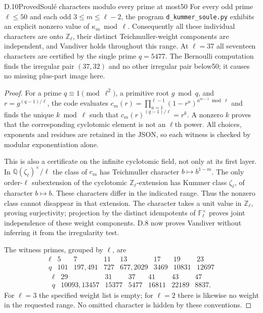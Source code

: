 \begin{statement}{D.10}{Proved}{Soulé characters modulo every prime at most50}
For every odd prime $\ell\leq50$ and each odd $3\leq m\leq\ell-2$, the program \texttt{d\_kummer\_soule.py} exhibits an explicit nonzero value of $\kappa_m\bmod\ell$. Consequently all these individual characters are onto $\mathbb Z_\ell$, their distinct Teichmuller-weight components are independent, and Vandiver holds throughout this range. At $\ell=37$ all seventeen characters are certified by the single prime $q=5477$. The Bernoulli computation finds the irregular pair $(37,32)$ and no other irregular pair below50; it causes no missing plus-part image here.
\end{statement}
\begin{proof}
For a prime $q\equiv1\pmod{\ell^2}$, a primitive root $g\bmod q$, and $r=g^{(q-1)/\ell}$, the code evaluates
$c_m(r)=\prod_{a=1}^{\ell-1}(1-r^a)^{a^{m-1}\bmod\ell}$ and finds the unique $k\bmod\ell$ such that
$c_m(r)^{(q-1)/\ell}=r^k$. A nonzero $k$ proves that the corresponding cyclotomic element is not an $\ell$th power. All choices, exponents and residues are retained in the JSON, so each witness is checked by modular exponentiation alone.

This is also a certificate on the infinite cyclotomic field, not only at its first layer. In $\mathbb Q(\zeta_\ell)^\times/\ell$ the class of $c_m$ has Teichmuller character $b\mapsto b^{1-m}$. The only order-$\ell$ subextension of the cyclotomic $\mathbb Z_\ell$-extension has Kummer class $\zeta_\ell$, of character $b\mapsto b$. These characters differ in the indicated range. Thus the nonzero class cannot disappear in that extension. The character takes a unit value in $\mathbb Z_\ell$, proving surjectivity; projection by the distinct idempotents of $\mathbb F_\ell^\times$ proves joint independence of these weight components. D.8 now proves Vandiver without inferring it from the irregularity test.

The witness primes, grouped by $\ell$, are
\[
\begin{array}{c|rrrrrrr}
\ell&5&7&11&13&17&19&23\\\hline
q&101&197,491&727&677,2029&3469&10831&12697
\end{array}
\]
\[
\begin{array}{c|rrrrrr}
\ell&29&31&37&41&43&47\\\hline
q&10093,13457&15377&5477&16811&22189&8837.
\end{array}
\]
For $\ell=3$ the specified weight list is empty; for $\ell=2$ there is likewise no weight in the requested range. No omitted character is hidden by these conventions.
\end{proof}

